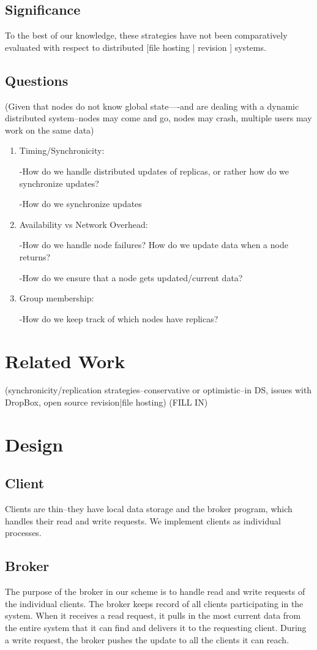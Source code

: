 \subsection{Significance}
To the best of our knowledge, these strategies have not been comparatively evaluated with respect to distributed [file hosting | revision ] systems.

\subsection{Questions}
(Given that nodes do not know global state----and are dealing with a dynamic distributed system--nodes may come and go, nodes may crash, multiple users may work on the same data)
\begin{enumerate}
\item Timing/Synchronicity:

-How do we handle distributed updates of replicas, or rather how do we synchronize updates?

-How do we synchronize updates

\item Availability vs Network Overhead:

-How do we handle node failures?  How do we update data when a node returns?

-How do we ensure that a node gets updated/current data?

\item Group membership:

-How do we keep track of which nodes have replicas?
\end{enumerate}

\section{Related Work}
(synchronicity/replication strategies--conservative or optimistic--in DS, issues with DropBox, open source revision|file hosting)
(FILL IN)

\section{Design}
\subsection{Client}
Clients are thin--they have local data storage and the broker program, which handles their read and write requests.
We implement clients as individual processes.
\subsection{Broker}
The purpose of the broker in our scheme is to handle read and write requests of the individual clients. 
The broker keeps record of all clients participating in the system.
When it receives a read request, it pulls in the most current data from the entire system that it can find
and delivers it to the requesting client.
During a write request, the broker pushes the update to all the clients it can reach.
